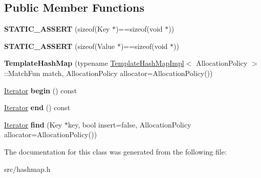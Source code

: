 \subsection*{Public Member Functions}
\begin{DoxyCompactItemize}
\item 
\hypertarget{classv8_1_1internal_1_1_template_hash_map_a16ea8f28ce419b2f52b29fb561a3becd}{}{\bfseries S\+T\+A\+T\+I\+C\+\_\+\+A\+S\+S\+E\+R\+T} (sizeof(Key $\ast$)==sizeof(void $\ast$))\label{classv8_1_1internal_1_1_template_hash_map_a16ea8f28ce419b2f52b29fb561a3becd}

\item 
\hypertarget{classv8_1_1internal_1_1_template_hash_map_ad4553c341840131da132d9bba52e1b51}{}{\bfseries S\+T\+A\+T\+I\+C\+\_\+\+A\+S\+S\+E\+R\+T} (sizeof(Value $\ast$)==sizeof(void $\ast$))\label{classv8_1_1internal_1_1_template_hash_map_ad4553c341840131da132d9bba52e1b51}

\item 
\hypertarget{classv8_1_1internal_1_1_template_hash_map_a2dbfcf5b0e072d3215b9a328902c4087}{}{\bfseries Template\+Hash\+Map} (typename \hyperlink{classv8_1_1internal_1_1_template_hash_map_impl}{Template\+Hash\+Map\+Impl}$<$ Allocation\+Policy $>$\+::Match\+Fun match, Allocation\+Policy allocator=Allocation\+Policy())\label{classv8_1_1internal_1_1_template_hash_map_a2dbfcf5b0e072d3215b9a328902c4087}

\item 
\hypertarget{classv8_1_1internal_1_1_template_hash_map_a3e45b5733032f44df627281abba5132a}{}\hyperlink{classv8_1_1internal_1_1_template_hash_map_1_1_iterator}{Iterator} {\bfseries begin} () const \label{classv8_1_1internal_1_1_template_hash_map_a3e45b5733032f44df627281abba5132a}

\item 
\hypertarget{classv8_1_1internal_1_1_template_hash_map_ac0f9de87ab2031af02d8223a2b806537}{}\hyperlink{classv8_1_1internal_1_1_template_hash_map_1_1_iterator}{Iterator} {\bfseries end} () const \label{classv8_1_1internal_1_1_template_hash_map_ac0f9de87ab2031af02d8223a2b806537}

\item 
\hypertarget{classv8_1_1internal_1_1_template_hash_map_a7b6272cfd164aa89b907b9b025983851}{}\hyperlink{classv8_1_1internal_1_1_template_hash_map_1_1_iterator}{Iterator} {\bfseries find} (Key $\ast$key, bool insert=false, Allocation\+Policy allocator=Allocation\+Policy())\label{classv8_1_1internal_1_1_template_hash_map_a7b6272cfd164aa89b907b9b025983851}

\end{DoxyCompactItemize}


The documentation for this class was generated from the following file\+:\begin{DoxyCompactItemize}
\item 
src/hashmap.\+h\end{DoxyCompactItemize}
